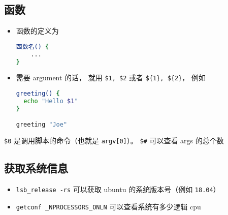\subsection{函数}

\begin{itemize}
\item 函数的定义为
\begin{lstlisting}[language=bash]
函数名() {
	...
}
\end{lstlisting}
\item 需要 argument 的话， 就用 \verb|$1, $2| 或者 \verb|${1}, ${2}|， 例如
\begin{lstlisting}[language=bash]
greeting() {
  echo "Hello $1"
}

greeting "Joe"
\end{lstlisting}
\end{itemize}

\verb|$0| 是调用脚本的命令（也就是 \verb|argv[0]|）。 \verb|$#| 可以查看 args 的总个数

\subsection{获取系统信息}
\begin{itemize}
\item \verb`lsb_release -rs` 可以获取 ubuntu 的系统版本号（例如 \verb|18.04|）
\item \verb|getconf _NPROCESSORS_ONLN| 可以查看系统有多少逻辑 cpu
\end{itemize}
